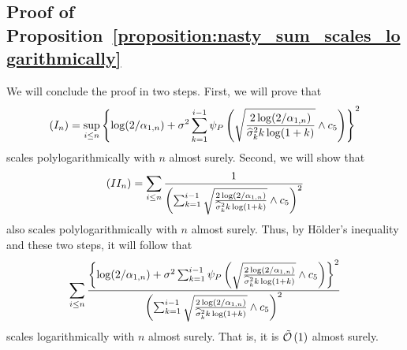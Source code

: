     
\subsection{Proof of Proposition~\ref{proposition:nasty_sum_scales_logarithmically}} \label{proof:nasty_sum_scales_logarithmically}


We will conclude the proof in two steps. First, we will prove that
\begin{align*}
    (I_n) = \sup_{i\leq n}\left\{ \log(2/\alpha_{1,n}) + \sigma^2\sum_{k=1}^{i-1} \psi_P\left(\sqrt\frac{2\log(2/\alpha_{1,n})}{\widehat \sigma_{k}^2 k \log (1+k)} \wedge c_5\right)\right\}^2
\end{align*}
scales polylogarithmically with $n$ almost surely. Second, we will show that 
\begin{align*}
    (II_n)=\sum_{i \leq n} \frac{1}{\left( \sum_{k=1}^{i-1} \sqrt\frac{2\log(2/\alpha_{1,n})}{\widehat \sigma_{k}^2 k \log (1+k)}\wedge c_5 \right)^2}
\end{align*}
also scales polylogarithmically with $n$ almost surely. Thus, by Hölder's inequality and these two steps, it will follow that 
\begin{align} \label{eq:before_holder}
    \sum_{i \leq n} \frac{\left\{ \log(2/\alpha_{1,n}) + \sigma^2\sum_{k=1}^{i-1} \psi_P\left(\sqrt\frac{2\log(2/\alpha_{1,n})}{\widehat \sigma_{k}^2 k \log (1+k)}\wedge c_5\right)\right\}^2}{\left( \sum_{k=1}^{i-1} \sqrt\frac{2\log(2/\alpha_{1,n})}{\widehat \sigma_{k}^2 k \log (1+k)} \wedge c_5\right)^2}
\end{align}
scales logarithmically with $n$ almost surely. That is, it is $\tilde{\mathcal{O}} \left( 1\right)$ almost surely.

